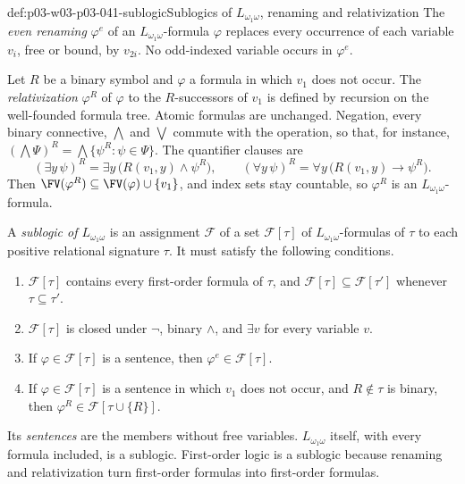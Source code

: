 \begin{hbdefinition}{def:p03-w03-p03-041-sublogic}{Sublogics of \(L_{\omega_1\omega}\), renaming and relativization}
The \emph{even renaming} \(\varphi^{e}\) of an
\(L_{\omega_1\omega}\)-formula \(\varphi\) replaces every occurrence of
each variable \(v_i\), free or bound, by \(v_{2i}\). No odd-indexed
variable occurs in \(\varphi^{e}\).

Let \(R\) be a binary symbol and \(\varphi\) a formula in which \(v_1\)
does not occur. The \emph{relativization} \(\varphi^{R}\) of
\(\varphi\) to the \(R\)-successors of \(v_1\) is defined by recursion on
the well-founded formula tree. Atomic formulas are unchanged. Negation,
every binary connective, \(\bigwedge\) and \(\bigvee\) commute with the
operation, so that, for instance,
\((\bigwedge\Psi)^{R}=\bigwedge\{\psi^{R}:\psi\in\Psi\}\). The
quantifier clauses are
\[
 (\exists y\,\psi)^{R}=\exists y\,\bigl(R(v_1,y)\land\psi^{R}\bigr),
 \qquad
 (\forall y\,\psi)^{R}=\forall y\,\bigl(R(v_1,y)\to\psi^{R}\bigr).
\]
Then \(\FV(\varphi^{R})\subseteq\FV(\varphi)\cup\{v_1\}\), and index sets
stay countable, so \(\varphi^{R}\) is an \(L_{\omega_1\omega}\)-formula.

A \emph{sublogic of \(L_{\omega_1\omega}\)} is an assignment
\(\mathcal F\) of a set \(\mathcal F[\tau]\) of
\(L_{\omega_1\omega}\)-formulas of \(\tau\) to each positive relational
signature \(\tau\). It must satisfy the following conditions.
\begin{enumerate}
\item[(F1)] \(\mathcal F[\tau]\) contains every first-order formula of
      \(\tau\), and \(\mathcal F[\tau]\subseteq\mathcal F[\tau']\) whenever
      \(\tau\subseteq\tau'\).
\item[(F2)] \(\mathcal F[\tau]\) is closed under \(\neg\), binary
      \(\land\), and \(\exists v\) for every variable \(v\).
\item[(F3)] If \(\varphi\in\mathcal F[\tau]\) is a sentence, then
      \(\varphi^{e}\in\mathcal F[\tau]\).
\item[(F4)] If \(\varphi\in\mathcal F[\tau]\) is a sentence in which
      \(v_1\) does not occur, and \(R\notin\tau\) is binary, then
      \(\varphi^{R}\in\mathcal F[\tau\cup\{R\}]\).
\end{enumerate}
Its \emph{sentences} are the members without free variables.
\(L_{\omega_1\omega}\) itself, with every formula included, is a
sublogic. First-order logic is a sublogic because renaming and
relativization turn first-order formulas into first-order formulas.
\end{hbdefinition}

